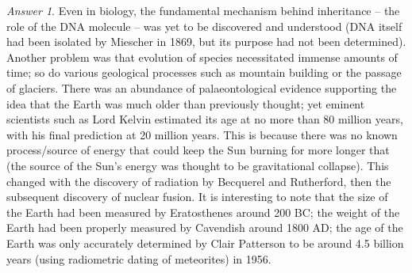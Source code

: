 \documentclass[11pt]{article}
\theoremstyle{remark}
\newtheorem*{answer}{Answer}
\begin{document}
\begin{answer}
        Even in biology, the fundamental mechanism behind inheritance -- the role of
        the DNA molecule -- was yet to be discovered and understood (DNA itself had
        been isolated by Miescher in 1869, but its purpose had not been determined).
        Another problem was that evolution of species necessitated immense amounts of
        time; so do various geological processes such as mountain building or the
        passage of glaciers. There was an abundance of palaeontological evidence
        supporting the idea that the Earth was much older than previously thought;
        yet eminent scientists such as Lord Kelvin estimated its age at no more than
        80 million years, with his final prediction at 20 million years. This is
        because there was no known process/source of energy that could keep the Sun
        burning for more longer that (the source of the Sun's energy was thought to
        be gravitational collapse).  This changed with the discovery of radiation by
        Becquerel and Rutherford, then the subsequent discovery of nuclear fusion. It
        is interesting to note that the size of the Earth had been measured by
        Eratosthenes around 200 BC; the weight of the Earth had been properly
        measured by Cavendish around 1800 AD; the age of the Earth was only
        accurately determined by Clair Patterson to be around 4.5 billion years
        (using radiometric dating of meteorites) in 1956.
    \end{answer}
    
\end{document}
